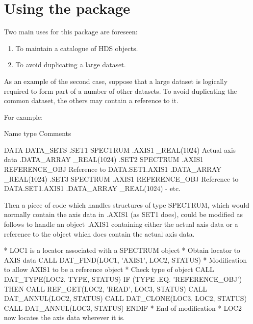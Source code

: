 \documentclass[twoside,11pt,nolof]{starlink}
\begin{document}
\section{Using the package}
\label{using_the_package}

Two main uses for this package are foreseen:

\begin{enumerate}
\item To maintain a catalogue of HDS objects.
\item To avoid duplicating a large dataset.
\end{enumerate}

As an example of the second case, suppose that a large dataset is
logically required to form part of a number of other datasets.  To
avoid duplicating the common dataset, the others may contain a
reference to it.

For example:
\begin{small}
\begin{terminalv}
   Name                type                  Comments

DATA                DATA_SETS
  .SET1             SPECTRUM
     .AXIS1         _REAL(1024)          Actual axis data
     .DATA_ARRAY    _REAL(1024)
  .SET2             SPECTRUM
     .AXIS1         REFERENCE_OBJ        Reference to DATA.SET1.AXIS1
     .DATA_ARRAY    _REAL(1024)
  .SET3             SPECTRUM
     .AXIS1         REFERENCE_OBJ        Reference to DATA.SET1.AXIS1
     .DATA_ARRAY    _REAL(1024)
   -
  etc.
\end{terminalv}
\end{small}

Then a piece of code which handles structures of type SPECTRUM, which
would normally contain the axis data in .AXIS1 (as SET1 does), could be
modified as follows to handle an object .AXIS1 containing either the
actual axis data or a reference to the object which does contain the
actual axis data.

\begin{small}
\begin{terminalv}
*    LOC1 is a locator associated with a SPECTRUM object
*    Obtain locator to AXIS data
      CALL DAT_FIND(LOC1, 'AXIS1', LOC2, STATUS)
*    Modification to allow AXIS1 to be a reference object
*    Check type of object
      CALL DAT_TYPE(LOC2, TYPE, STATUS)
      IF (TYPE .EQ. 'REFERENCE_OBJ') THEN
          CALL REF_GET(LOC2, 'READ', LOC3, STATUS)
          CALL DAT_ANNUL(LOC2, STATUS)
          CALL DAT_CLONE(LOC3, LOC2, STATUS)
          CALL DAT_ANNUL(LOC3, STATUS)
      ENDIF
*    End of modification
*    LOC2 now locates the axis data wherever it is.
\end{terminalv}
\end{small}
\end{document}
